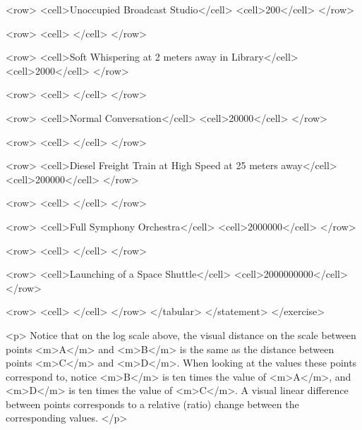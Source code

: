                     <row>
                        <cell>Unoccupied Broadcast Studio</cell>
                        <cell>200</cell>
                    </row>

                    <row>
                        <cell> </cell>
                    </row>

                    <row>
                        <cell>Soft Whispering at 2 meters away in Library</cell>
                        <cell>2000</cell>
                    </row>

                    <row>
                        <cell> </cell>
                    </row>

                    <row>
                        <cell>Normal Conversation</cell>
                        <cell>20000</cell>
                    </row>

                    <row>
                        <cell> </cell>
                    </row>

                    <row>
                        <cell>Diesel Freight Train at High Speed at 25 meters away</cell>
                        <cell>200000</cell>
                    </row>

                    <row>
                        <cell> </cell>
                    </row>

                    <row>
                        <cell>Full Symphony Orchestra</cell>
                        <cell>2000000</cell>
                    </row>

                    <row>
                        <cell> </cell>
                    </row>

                    <row>
                        <cell>Launching of a Space Shuttle</cell>
                        <cell>2000000000</cell>
                    </row>

                    <row>
                        <cell> </cell>
                    </row>
                </tabular>
            </statement>
        </exercise>

        <p>
            Notice that on the log scale above, the visual distance on the scale between points <m>A</m> and <m>B</m> is the same as the distance between points <m>C</m> and <m>D</m>.
            When looking at the values these points correspond to, notice <m>B</m> is ten times the value of <m>A</m>, and <m>D</m> is ten times the value of <m>C</m>.
            A visual linear difference between points corresponds to a relative (ratio) change between the corresponding values.
        </p>

